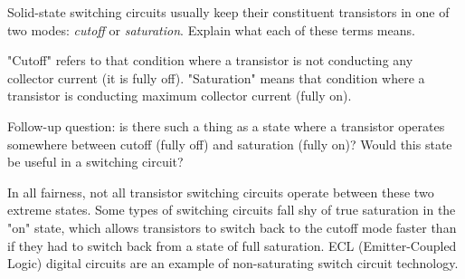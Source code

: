 

Solid-state switching circuits usually keep their constituent transistors in one of two modes: {\it cutoff} or {\it saturation}.  Explain what each of these terms means.







"Cutoff" refers to that condition where a transistor is not conducting any collector current (it is fully off).  "Saturation" means that condition where a transistor is conducting maximum collector current (fully on).

\vskip 10pt

Follow-up question: is there such a thing as a state where a transistor operates somewhere between cutoff (fully off) and saturation (fully on)?  Would this state be useful in a switching circuit?







In all fairness, not all transistor switching circuits operate between these two extreme states.  Some types of switching circuits fall shy of true saturation in the "on" state, which allows transistors to switch back to the cutoff mode faster than if they had to switch back from a state of full saturation.  ECL (Emitter-Coupled Logic) digital circuits are an example of non-saturating switch circuit technology.





